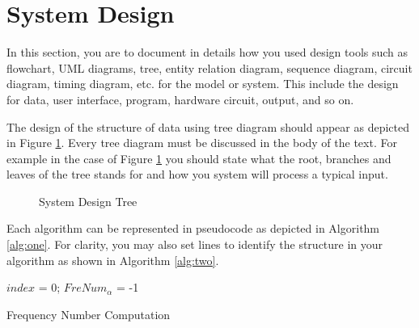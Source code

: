 \section{System Design} 

In this section, you are to document in details how you used design tools such as flowchart, UML diagrams, tree, entity relation diagram, sequence diagram, circuit diagram, timing diagram, etc. for the model or system. This include the design for data, user interface, program, hardware circuit, output, and so on.

The design of the structure of data using tree diagram should appear as depicted in Figure \ref{TreeTrans}. Every tree diagram must be discussed in the body of the text. For example in the case of Figure \ref{TreeTrans} you should state what the root, branches and leaves of the tree stands for and how you system will process a typical  input.

\begin{figure}[!h]
	\centering
{}
	\caption{System Design Tree}
	\label{TreeTrans}
\end{figure}


Each algorithm can be represented in pseudocode as depicted in Algorithm 	\ref{alg:one}. For clarity, you may also set lines to identify the structure in your algorithm as shown in Algorithm 	\ref{alg:two}.

\begin{algorithm}[t]
\SetAlgoNoLine
	$index$ = 0; $FreNum_{\alpha}$ = -1\;
	\caption{Frequency Number Computation}
	\label{alg:one}
\end{algorithm}




